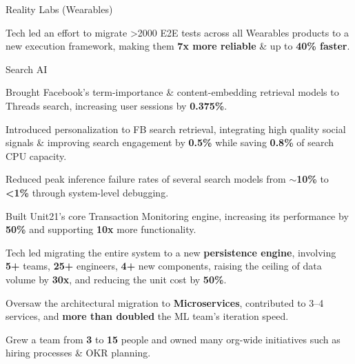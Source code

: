 \documentclass[letterpaper]{deedy-resume} %
\begin{document}
\begin{minipage}[t]{0.63\textwidth}
\vspace{0.1em}
Reality Labs (Wearables)
\begin{tightitemize}
\item Tech led an effort to migrate >2000 E2E tests across all Wearables products to a new execution framework, making them \textbf{7x more reliable} \& up to \textbf{40\% faster}.
\end{tightitemize}
\vspace{0.1em}
Search AI
\begin{tightitemize}
\item Brought Facebook's term-importance \& content-embedding retrieval models to Threads search, increasing user sessions by \textbf{0.375\%}.
\item Introduced personalization to FB search retrieval, integrating high quality social signals \& improving search engagement by \textbf{0.5\%} while saving \textbf{0.8\%} of search CPU capacity.
\item Reduced peak inference failure rates of several search models from \textbf{$\sim$10\%} to \textbf{<1\%} through system-level debugging.
\end{tightitemize}
%
\sectionspace %
\vspace{-0.3em}

\begin{tightitemize}
\item Built Unit21's core Transaction Monitoring engine, increasing its performance by \textbf{50\%} and supporting \textbf{10x} more functionality.
\item Tech led migrating the entire system to a new \textbf{persistence engine}, involving \textbf{5+} teams, \textbf{25+} engineers, \textbf{4+} new components, raising the ceiling of data volume by \textbf{30x}, and reducing the unit cost by \textbf{50\%}.
\item Oversaw the architectural migration to \textbf{Microservices}, contributed to 3--4 services, and \textbf{more than doubled} the ML team's iteration speed.
\item Grew a team from \textbf{3} to \textbf{15} people and owned many org-wide initiatives such as hiring processes \& OKR planning.
\end{tightitemize}


\end{minipage}
\end{document}
